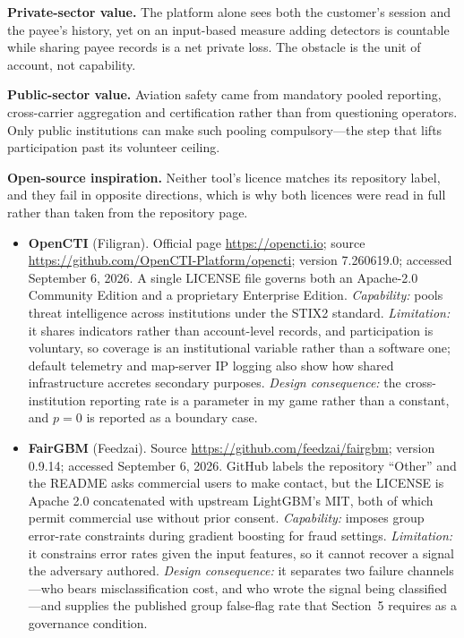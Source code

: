 \textbf{Private-sector value.} The platform alone sees both the customer's session and the payee's history, yet on an input-based measure adding detectors is countable while sharing payee records is a net private loss. The obstacle is the unit of account, not capability.

\textbf{Public-sector value.} Aviation safety came from mandatory pooled reporting, cross-carrier aggregation and certification rather than from questioning operators. Only public institutions can make such pooling compulsory---the step that lifts participation past its volunteer ceiling.

\textbf{Open-source inspiration.} Neither tool's licence matches its repository label, and they fail in opposite directions, which is why both licences were read in full rather than taken from the repository page.

\begin{itemize}
\item \textbf{OpenCTI} (Filigran). Official page \url{https://opencti.io}; source \url{https://github.com/OpenCTI-Platform/opencti}; version 7.260619.0; accessed September 6, 2026. A single LICENSE file governs both an Apache-2.0 Community Edition and a proprietary Enterprise Edition. \emph{Capability:} pools threat intelligence across institutions under the STIX2 standard. \emph{Limitation:} it shares indicators rather than account-level records, and participation is voluntary, so coverage is an institutional variable rather than a software one; default telemetry and map-server IP logging also show how shared infrastructure accretes secondary purposes. \emph{Design consequence:} the cross-institution reporting rate is a parameter in my game rather than a constant, and $p=0$ is reported as a boundary case.

\item \textbf{FairGBM} (Feedzai). Source \url{https://github.com/feedzai/fairgbm}; version 0.9.14; accessed September 6, 2026. GitHub labels the repository ``Other'' and the README asks commercial users to make contact, but the LICENSE is Apache 2.0 concatenated with upstream LightGBM's MIT, both of which permit commercial use without prior consent. \emph{Capability:} imposes group error-rate constraints during gradient boosting for fraud settings. \emph{Limitation:} it constrains error rates given the input features, so it cannot recover a signal the adversary authored. \emph{Design consequence:} it separates two failure channels---who bears misclassification cost, and who wrote the signal being classified---and supplies the published group false-flag rate that Section~5 requires as a governance condition.
\end{itemize}

